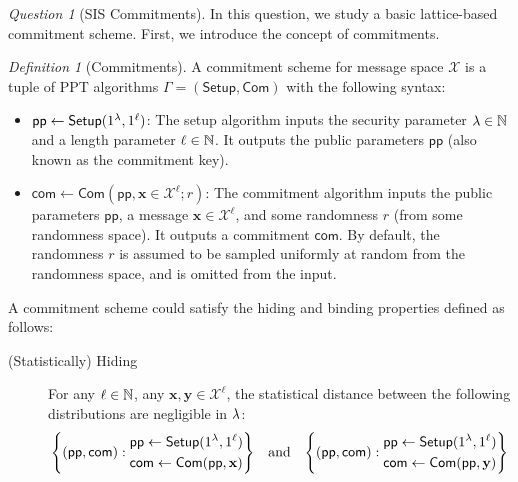 \documentclass[10pt,twoside]{article}
\newif\ifsolution
\newcommand{\inputsol}[1]{\ifsolution\begin{tcolorbox}[breakable]\end{tcolorbox}\fi}
\theoremstyle{remark}
\newtheorem*{definition*}{Definition}
\newtheorem{question}{Question}
\renewcommand{\vec}[1]{\mathbf{#1}}
\newcommand{\pubparam}{\mathsf{pp}}
\begin{document}
\inputsol{lindner_peikert}

\begin{question}[SIS Commitments]
    In this question, we study a basic lattice-based commitment scheme. First, we introduce the concept of commitments.
    \begin{definition*}[Commitments]
        A commitment scheme for message space $\mathcal{X}$ is a tuple of PPT algorithms $\Gamma = (\mathsf{Setup}, \mathsf{Com})$ with the following syntax:
        \begin{itemize}
            \item $\pubparam \gets \mathsf{Setup}(\secparam, 1^\ell)$: The setup algorithm inputs the security parameter $\lambda \in \mathbb{N}$ and a length parameter $\ell \in \mathbb{N}$. It outputs the public parameters $\pubparam$ (also known as the commitment key). 
            \item $\mathsf{com} \gets \mathsf{Com}(\pubparam, \vec{x} \in \mathcal{X}^\ell; r)$: The commitment algorithm inputs the public parameters $\pubparam$, a message $\vec{x} \in \mathcal{X}^\ell$, and some randomness $r$ (from some randomness space). It outputs a commitment $\mathsf{com}$. By default, the randomness $r$ is assumed to be sampled uniformly at random from the randomness space, and is omitted from the input.
        \end{itemize}
        A commitment scheme could satisfy the hiding and binding properties defined as follows:
        \begin{description}
            \item[(Statistically) Hiding] For any $\ell \in \mathbb{N}$, any $\vec{x}, \vec{y} \in \mathcal{X}^\ell$, the statistical distance between the following distributions are negligible in $\lambda$:
            \begin{align*}
                \set{
                    (\pubparam, \mathsf{com}): 
                    \begin{aligned}
                        &\pubparam \gets \mathsf{Setup}(\secparam, 1^\ell) \\
                        &\mathsf{com} \gets \mathsf{Com}(\pubparam, \vec{x})
                    \end{aligned}
                }
                && \text{and} &&
                \set{
                    (\pubparam, \mathsf{com}): 
                    \begin{aligned}
                        &\pubparam \gets \mathsf{Setup}(\secparam, 1^\ell) \\
                        &\mathsf{com} \gets \mathsf{Com}(\pubparam, \vec{y})

\end{aligned}}
\end{align*}
\end{description}
\end{definition*}
\end{question}
\end{document}
